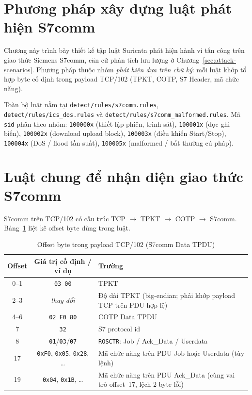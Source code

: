 \documentclass[../main.tex]{subfiles}
\begin{document}
\section{Phương pháp xây dựng luật phát hiện S7comm}
\label{sec:detection-overview}

Chương này trình bày thiết kế tập luật Suricata phát hiện hành vi tấn công trên giao thức Siemens S7comm, căn cứ phân tích lưu lượng ở Chương~\ref{sec:attack-scenarios}. Phương pháp thuộc nhóm \emph{phát hiện dựa trên chữ ký}: mỗi luật khớp tổ hợp byte cố định trong payload TCP/102 (TPKT, COTP, S7 Header, mã chức năng). 

Toàn bộ luật nằm tại \texttt{detect/rules/s7comm.rules}, \texttt{detect/rules/ics\_dos.rules} và \texttt{detect/rules/s7comm\_malformed.rules}. Mã \texttt{sid} phân theo nhóm: \texttt{100000x} (thiết lập phiên, trinh sát), \texttt{100001x} (đọc ghi biến), \texttt{100002x} (download upload block), \texttt{100003x} (điều khiển Start/Stop), \texttt{100004x} (DoS / flood tần suất), \texttt{100005x} (malformed / bất thường cú pháp).

\section{Luật chung để nhận diện giao thức S7comm}
\label{sec:rule-foundation}

S7comm trên TCP/102 có cấu trúc TCP $\rightarrow$ TPKT $\rightarrow$ COTP $\rightarrow$ S7comm. Bảng~\ref{tab:s7-payload-offsets} liệt kê offset byte dùng trong luật.

\begin{table}[H]
    \centering
    \caption{Offset byte trong payload TCP/102 (S7comm Data TPDU)}
    \label{tab:s7-payload-offsets}
    \begin{tabular}{|c|c|p{6.8cm}|}
        \hline
        \textbf{Offset} & \textbf{Giá trị cố định / ví dụ} & \textbf{Trường} \\
        \hline
        0--1 & \texttt{03 00} & TPKT \\
        \hline
        2--3 & \emph{thay đổi} & Độ dài TPKT (big-endian; phải khớp payload TCP trên PDU hợp lệ) \\
        \hline
        4--6 & \texttt{02 F0 80} & COTP Data TPDU \\
        \hline
        7 & \texttt{32} & S7 protocol id \\
        \hline
        8 & \texttt{01}/\texttt{03}/\texttt{07} & \texttt{ROSCTR}: Job / Ack\_Data / Userdata \\
        \hline
        17 & \texttt{0xF0}, \texttt{0x05}, \texttt{0x28}, \ldots & Mã chức năng trên PDU Job hoặc Userdata (tùy lệnh) \\
        \hline
        19 & \texttt{0x04}, \texttt{0x1B}, \ldots & Mã chức năng trên PDU Ack\_Data (cùng vai trò offset~17, lệch 2 byte lỗi) \\
        \hline
    \end{tabular}
\end{table}
\end{document}
